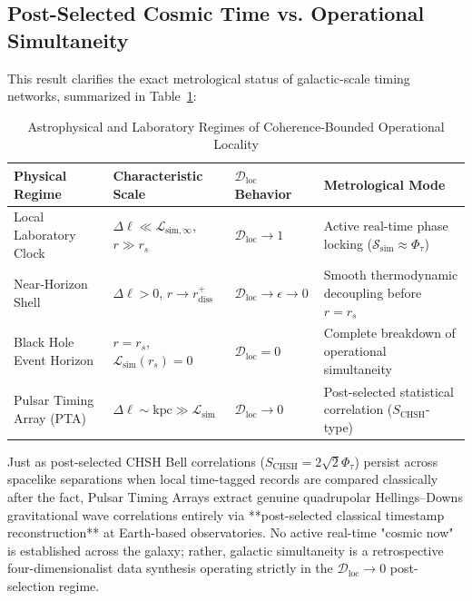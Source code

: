 \documentclass[11pt,a4paper]{article}
\begin{document}
\subsection{Post-Selected Cosmic Time vs. Operational Simultaneity}

This result clarifies the exact metrological status of galactic-scale timing networks, summarized in Table~\ref{tab:astrophysical_regimes}:

\begin{table}[h!]
\centering
\caption{Astrophysical and Laboratory Regimes of Coherence-Bounded Operational Locality}
\label{tab:astrophysical_regimes}
\renewcommand{\arraystretch}{1.25}
\begin{tabular}{@{}llll@{}}
\toprule
\textbf{Physical Regime} & \textbf{Characteristic Scale} & \textbf{$\mathcal{D}_{\mathrm{loc}}$ Behavior} & \textbf{Metrological Mode} \\
\midrule
Local Laboratory Clock & $\Delta\ell \ll \mathcal{L}_{\mathrm{sim},\infty}$, $r \gg r_s$ & $\mathcal{D}_{\mathrm{loc}} \to 1$ & Active real-time phase locking ($\mathcal{S}_{\mathrm{sim}} \approx \Phi_\tau$) \\
Near-Horizon Shell & $\Delta\ell > 0$, $r \to r_{\mathrm{diss}}^+$ & $\mathcal{D}_{\mathrm{loc}} \to \epsilon \to 0$ & Smooth thermodynamic decoupling before $r = r_s$ \\
Black Hole Event Horizon & $r = r_s$, $\mathcal{L}_{\mathrm{sim}}(r_s) = 0$ & $\mathcal{D}_{\mathrm{loc}} = 0$ & Complete breakdown of operational simultaneity \\
Pulsar Timing Array (PTA) & $\Delta\ell \sim \mathrm{kpc} \gg \mathcal{L}_{\mathrm{sim}}$ & $\mathcal{D}_{\mathrm{loc}} \to 0$ & Post-selected statistical correlation ($S_{\mathrm{CHSH}}$-type) \\
\bottomrule
\end{tabular}
\end{table}

Just as post-selected CHSH Bell correlations ($S_{\mathrm{CHSH}} = 2\sqrt{2}\Phi_\tau$) persist across spacelike separations when local time-tagged records are compared classically after the fact, Pulsar Timing Arrays extract genuine quadrupolar Hellings--Downs gravitational wave correlations entirely via **post-selected classical timestamp reconstruction** at Earth-based observatories. No active real-time "cosmic now" is established across the galaxy; rather, galactic simultaneity is a retrospective four-dimensionalist data synthesis operating strictly in the $\mathcal{D}_{\mathrm{loc}} \to 0$ post-selection regime.
\end{document}
